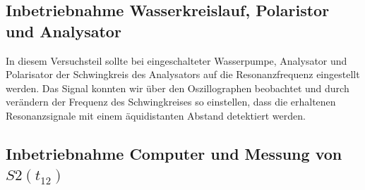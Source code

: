 \documentclass[paper=a4,
	fontsize=10pt,
	DIV=18,
	twocolumn,
	parskip=half
	]{scrartcl}
\numberwithin{equation}{section}    %
\begin{document}

\subsection{Inbetriebnahme Wasserkreislauf, Polaristor und Analysator}
\label{auswertung2}

In diesem Versuchsteil sollte bei eingeschalteter Wasserpumpe, Analysator und Polarisator der Schwingkreis des Analysators auf die Resonanzfrequenz eingestellt werden. Das Signal konnten wir über den Oszillographen beobachtet und durch verändern der Frequenz des Schwingkreises so einstellen, dass die erhaltenen Resonanzsignale mit einem äquidistanten Abstand detektiert werden.


\subsection{Inbetriebnahme Computer und Messung von $S2(t_{12})$}
\label{auswertung3}
\end{document}
